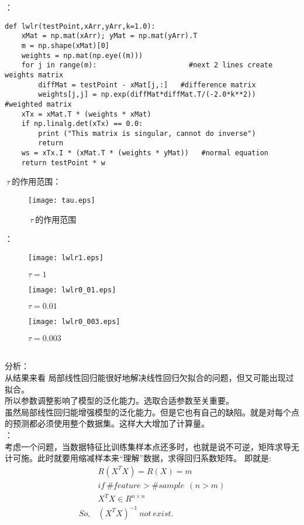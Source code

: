 ：
\begin{lstlisting}
def lwlr(testPoint,xArr,yArr,k=1.0):
    xMat = np.mat(xArr); yMat = np.mat(yArr).T
    m = np.shape(xMat)[0]
    weights = np.mat(np.eye((m)))
    for j in range(m):                      #next 2 lines create weights matrix
        diffMat = testPoint - xMat[j,:]   #difference matrix
        weights[j,j] = np.exp(diffMat*diffMat.T/(-2.0*k**2))   #weighted matrix
    xTx = xMat.T * (weights * xMat)
    if np.linalg.det(xTx) == 0.0:
        print ("This matrix is singular, cannot do inverse")
        return
    ws = xTx.I * (xMat.T * (weights * yMat))   #normal equation
    return testPoint * w
\end{lstlisting}

$~\tau~$的作用范围：
\begin{figure}[!h]
  \centering
  \texttt{[image: tau.eps]}
  \caption{$~\tau~$的作用范围}
\end{figure}

：
\begin{figure}[!h]
  \centering
  \texttt{[image: lwlr1.eps]}
  \caption{$\tau=1$}
\end{figure}
\begin{figure}[!htb]
  \centering
  \texttt{[image: lwlr0\_01.eps]}
  \caption{$\tau=0.01$}
\end{figure}
\begin{figure}[!htb]
  \centering
  \texttt{[image: lwlr0\_003.eps]}
  \caption{$\tau=0.003$}
\end{figure}\\
分析：\\
从结果来看 局部线性回归能很好地解决线性回归欠拟合的问题，但又可能出现过拟合。\\
所以参数调整影响了模型的泛化能力。选取合适参数至关重要。\\
虽然局部线性回归能增强模型的泛化能力。但是它也有自己的缺陷。就是对每个点的预测都必须使用整个数据集。这样大大增加了计算量。\\

：\\
考虑一个问题，当数据特征比训练集样本点还多时，也就是说不可逆，矩阵求导无计可施。此时就要用缩减样本来“理解”数据，求得回归系数矩阵。
即就是:
\begin{equation}\nonumber
\begin{split}
  &R(X^TX)=R(X)=m\\
  &if~\#feature>\#sample ~~(n>m)\\
  &X^TX\in R^{n\times n}\\
  So,&(X^TX)^{-1}~not~exist.
\end{split}
\end{equation}

